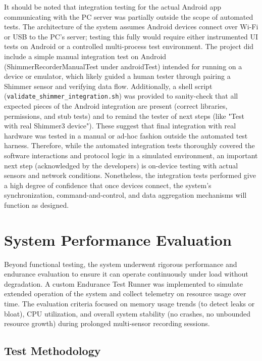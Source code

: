 It should be noted that integration testing for the actual Android app communicating with the PC server was partially outside the scope of automated tests. The architecture of the system assumes Android devices connect over Wi-Fi or USB to the PC's server; testing this fully would require either instrumented UI tests on Android or a controlled multi-process test environment. The project did include a simple manual integration test on Android (ShimmerRecorderManualTest under androidTest) intended for running on a device or emulator, which likely guided a human tester through pairing a Shimmer sensor and verifying data flow. Additionally, a shell script (\texttt{validate\_shimmer\_integration.sh}) was provided to sanity-check that all expected pieces of the Android integration are present (correct libraries, permissions, and stub tests) and to remind the tester of next steps (like "Test with real Shimmer3 device"). These suggest that final integration with real hardware was tested in a manual or ad-hoc fashion outside the automated test harness. Therefore, while the automated integration tests thoroughly covered the software interactions and protocol logic in a simulated environment, an important next step (acknowledged by the developers) is on-device testing with actual sensors and network conditions. Nonetheless, the integration tests performed give a high degree of confidence that once devices connect, the system's synchronization, command-and-control, and data aggregation mechanisms will function as designed.

\section{System Performance Evaluation}

Beyond functional testing, the system underwent rigorous performance and endurance evaluation to ensure it can operate continuously under load without degradation. A custom Endurance Test Runner was implemented to simulate extended operation of the system and collect telemetry on resource usage over time. The evaluation criteria focused on memory usage trends (to detect leaks or bloat), CPU utilization, and overall system stability (no crashes, no unbounded resource growth) during prolonged multi-sensor recording sessions.

\subsection{Test Methodology}

